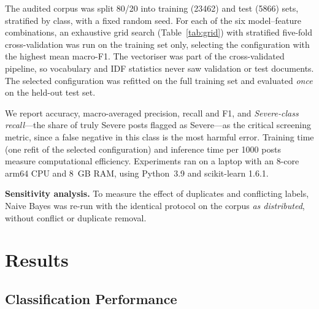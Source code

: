 \documentclass[conference]{IEEEtran}
\begin{document}
The audited corpus was split 80/20 into training (\num{23462}) and test (\num{5866}) sets, stratified by class, with a fixed random seed. For each of the six model--feature combinations, an exhaustive grid search (Table~\ref{tab:grid}) with stratified five-fold cross-validation was run on the training set only, selecting the configuration with the highest mean macro-F1. The vectoriser was part of the cross-validated pipeline, so vocabulary and IDF statistics never saw validation or test documents. The selected configuration was refitted on the full training set and evaluated \emph{once} on the held-out test set.

We report accuracy, macro-averaged precision, recall and F1, and \emph{Severe-class recall}---the share of truly Severe posts flagged as Severe---as the critical screening metric, since a false negative in this class is the most harmful error. Training time (one refit of the selected configuration) and inference time per \num{1000} posts measure computational efficiency. Experiments ran on a laptop with an 8-core arm64 CPU and 8~GB RAM, using Python~3.9 and scikit-learn 1.6.1.

\textbf{Sensitivity analysis.} To measure the effect of duplicates and conflicting labels, Naive Bayes was re-run with the identical protocol on the corpus \emph{as distributed}, without conflict or duplicate removal.

\section{Results}

\subsection{Classification Performance}
\end{document}
